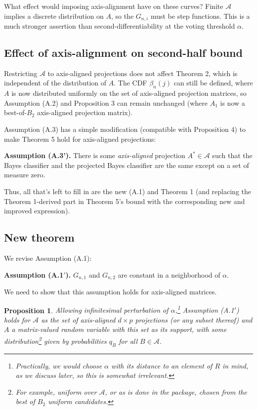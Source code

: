 \documentclass{amsart}
\newtheorem{proposition}{Proposition}
\begin{document}
What effect would imposing axis-alignment have on these curves?
Finite $\mathcal{A}$ implies a discrete distribution on $A$, so the $G_{n,i}$
must be step functions. This is a much stronger assertion than second-differentiability
at the voting threshold $\alpha$.

\subsection{Effect of axis-alignment on second-half bound}

Restricting $\mathcal A$ to axis-aligned projections does not affect Theorem 2, which is independent of the distribution of $A$.
The CDF $\beta_{n}(j)$ can still be defined, where $A$ is now distributed
uniformly on the set of axis-aligned projection matrices, so Assumption
(A.2) and Proposition 3 can remain unchanged (where $A_{1}$ is now
a best-of-$B_{2}$ axis-aligned projection matrix).

Assumption (A.3) has a simple modification (compatible with Proposition
4) to make Theorem 5 hold for axis-aligned projections:

\vspace{6pt}

\noindent \textbf{Assumption (A.3').} There is some \emph{axis-aligned}
projection $A^{*}\in\mathcal{A}$ such that the Bayes classifier and
the projected Bayes classifier are the same except on a set of measure
zero.

\vspace{6pt}

Thus, all that's left to fill in are the new (A.1) and Theorem 1 (and
replacing the Theorem 1-derived part in Theorem 5's bound with the
corresponding new and improved expression).


\subsection{New theorem}

We revise Assumption (A.1):

\vspace{6pt}

\noindent \textbf{Assumption (A.1$'$).} $G_{n,1}$ and $G_{n,2}$ are
constant in a neighborhood of $\alpha$.

\vspace{6pt}

We need to show that this assumption holds for axis-aligned matrices.

\begin{proposition}
Allowing infinitesimal perturbation of $\alpha$,\footnote{Practically, we would choose $\alpha$ with its distance to an element of $R$ in mind, as we discuss later, so this is somewhat irrelevant.} Assumption (A.1$'$) holds for $\mathcal{A}$ as the set of axis-aligned
$d\times p$ projections (or any subset thereof) and $A$ a matrix-valued
random variable with this set as its support, with some distribution\footnote{For example, uniform over $\mathcal{A}$, or as is done in the package,
chosen from the best of $B_{2}$ uniform candidates.} given by probabilities $q_{B}$ for all $B\in\mathcal{A}$.
\end{proposition}
\end{document}
